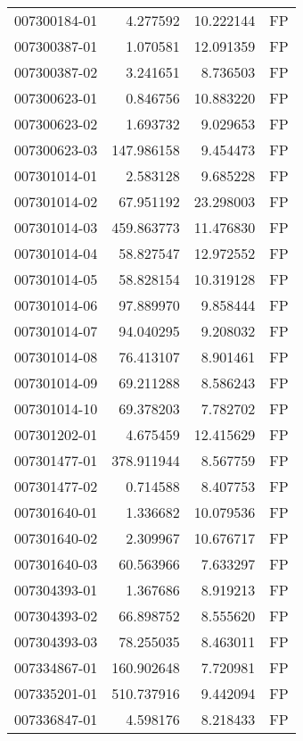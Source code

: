 \begin{tabular}{lrrl}
007300184-01 &    4.277592 &      10.222144 &   FP \\
007300387-01 &    1.070581 &      12.091359 &   FP \\
007300387-02 &    3.241651 &       8.736503 &   FP \\
007300623-01 &    0.846756 &      10.883220 &   FP \\
007300623-02 &    1.693732 &       9.029653 &   FP \\
007300623-03 &  147.986158 &       9.454473 &   FP \\
007301014-01 &    2.583128 &       9.685228 &   FP \\
007301014-02 &   67.951192 &      23.298003 &   FP \\
007301014-03 &  459.863773 &      11.476830 &   FP \\
007301014-04 &   58.827547 &      12.972552 &   FP \\
007301014-05 &   58.828154 &      10.319128 &   FP \\
007301014-06 &   97.889970 &       9.858444 &   FP \\
007301014-07 &   94.040295 &       9.208032 &   FP \\
007301014-08 &   76.413107 &       8.901461 &   FP \\
007301014-09 &   69.211288 &       8.586243 &   FP \\
007301014-10 &   69.378203 &       7.782702 &   FP \\
007301202-01 &    4.675459 &      12.415629 &   FP \\
007301477-01 &  378.911944 &       8.567759 &   FP \\
007301477-02 &    0.714588 &       8.407753 &   FP \\
007301640-01 &    1.336682 &      10.079536 &   FP \\
007301640-02 &    2.309967 &      10.676717 &   FP \\
007301640-03 &   60.563966 &       7.633297 &   FP \\
007304393-01 &    1.367686 &       8.919213 &   FP \\
007304393-02 &   66.898752 &       8.555620 &   FP \\
007304393-03 &   78.255035 &       8.463011 &   FP \\
007334867-01 &  160.902648 &       7.720981 &   FP \\
007335201-01 &  510.737916 &       9.442094 &   FP \\
007336847-01 &    4.598176 &       8.218433 &   FP \\

\end{tabular}
